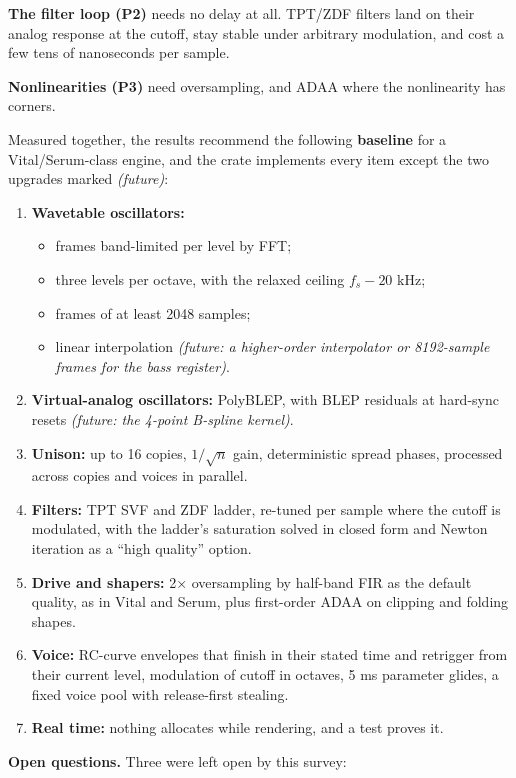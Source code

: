 \documentclass[conference]{IEEEtran}
\begin{document}
\textbf{The filter loop (P2)} needs no delay at all. TPT/ZDF filters land on their analog response at the cutoff, stay stable under arbitrary modulation, and cost a few tens of nanoseconds per sample.

\textbf{Nonlinearities (P3)} need oversampling, and ADAA where the nonlinearity has corners.

Measured together, the results recommend the following \textbf{baseline} for a Vital/Serum-class engine, and the crate implements every item except the two upgrades marked \emph{(future)}:

\begin{enumerate}
\item \textbf{Wavetable oscillators:}
\begin{itemize}
\item frames band-limited per level by FFT;
\item three levels per octave, with the relaxed ceiling $f_s - 20$ kHz;
\item frames of at least 2048 samples;
\item linear interpolation \emph{(future: a higher-order interpolator or 8192-sample frames for the bass register)}.
\end{itemize}
\item \textbf{Virtual-analog oscillators:} PolyBLEP, with BLEP residuals at hard-sync resets \emph{(future: the 4-point B-spline kernel)}.
\item \textbf{Unison:} up to 16 copies, $1/\sqrt n$ gain, deterministic spread phases, processed across copies and voices in parallel.
\item \textbf{Filters:} TPT SVF and ZDF ladder, re-tuned per sample where the cutoff is modulated, with the ladder's saturation solved in closed form and Newton iteration as a ``high quality'' option.
\item \textbf{Drive and shapers:} 2× oversampling by half-band FIR as the default quality, as in Vital and Serum, plus first-order ADAA on clipping and folding shapes.
\item \textbf{Voice:} RC-curve envelopes that finish in their stated time and retrigger from their current level, modulation of cutoff in octaves, 5 ms parameter glides, a fixed voice pool with release-first stealing.
\item \textbf{Real time:} nothing allocates while rendering, and a test proves it.
\end{enumerate}

\textbf{Open questions.} Three were left open by this survey:
\end{document}
